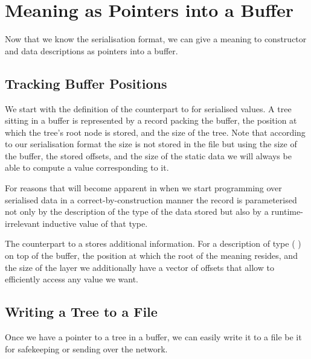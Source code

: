 \section{Meaning as Pointers into a Buffer}\label{sec:pointers}

Now that we know the serialisation format, we can give a meaning
to constructor and data descriptions as pointers into a buffer.

\subsection{Tracking Buffer Positions}

We start with the definition of the counterpart to 
for serialised values. A tree sitting in a buffer is represented
by a record packing the buffer, the position at which the tree's
root node is stored, and the size of the tree.
%
Note that according to our serialisation format the size is not stored
in the file but using the size of the buffer, the stored offsets,
and the size of the static data we will always
be able to compute a value corresponding to it.


For reasons that will become apparent in 
when we start programming over serialised data in a correct-by-construction
manner the record  is parameterised not only by the description
of the type of the data stored but also by a runtime-irrelevant inductive value of
that type.


The counterpart to a  stores additional information.
For a description of type (   )
on top of the buffer, the position at which the root of the meaning resides,
and the size of the layer we additionally have a vector of  offsets
that allow to efficiently access any value we want.

\subsection{Writing a Tree to a File}\label{sec:writetofile}

Once we have a pointer to a tree in a buffer, we can easily write it to a
file be it for safekeeping or sending over the network.


